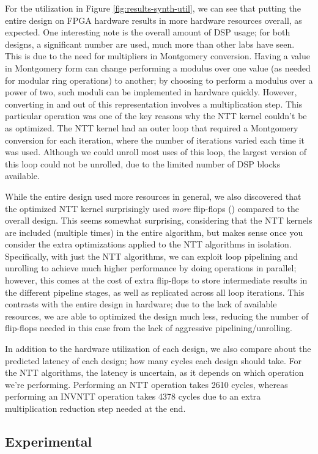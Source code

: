 For the utilization in Figure \ref{fig:results-synth-util},
we can see that putting the entire design on FPGA hardware
results in more hardware resources overall, as expected.
One interesting note is the overall amount of DSP usage; for
both designs, a significant number are used, much more than
other labs have seen. This is due to the need for multipliers
in Montgomery conversion. Having a value in Montgomery form
can change performing a modulus over one value (as needed
for modular ring operations) to another;
by choosing to perform a modulus over a power of two, such
moduli can be implemented in hardware quickly. However,
converting in and out of this representation involves a
multiplication step. This particular operation was one of
the key reasons why the NTT kernel couldn't be as
optimized. The NTT kernel had an outer loop that required
a Montgomery conversion for each iteration, where the
number of iterations varied each time it was used. Although
we could unroll most uses of this loop, the largest version
of this loop could not be unrolled, due to the limited
number of DSP blocks available.

While the entire design used more resources in general, we
also discovered that the optimized NTT kernel surprisingly
used \textit{more} flip-flops () compared to the
overall design. This seems somewhat surprising, considering
that the NTT kernels are included (multiple times) in the
entire algorithm, but makes sense once you consider the
extra optimizations applied to the NTT algorithms in
isolation. Specifically, with just the NTT algorithms, we
can exploit loop pipelining and unrolling to achieve much
higher performance by doing operations in parallel; however,
this comes at the cost of extra flip-flops to store
intermediate results in the different pipeline stages, as
well as replicated across all loop iterations. This contrasts
with the entire design in hardware; due to the lack of
available resources, we are able to optimized the design
much less, reducing the number of flip-flops needed in
this case from the lack of aggressive pipelining/unrolling.

In addition to the hardware utilization of each design, we
also compare about the predicted latency of each design;
how many cycles each design should take. For the NTT
algorithms, the latency is uncertain, as it depends on which
operation we're performing. Performing an NTT operation takes
2610 cycles, whereas performing an INVNTT operation takes 4378
cycles due to an extra multiplication reduction step needed at
the end.


\subsection*{Experimental}